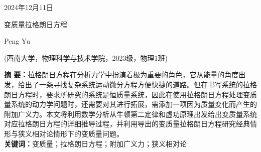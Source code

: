 \documentclass[12pt,twoside]{article}
\numberwithin{equation}{section}    %
\begin{document}
\begin{center}
\end{center}

\begin{center}
    2024年12月11日
\end{center}



\newpage
{}              %
\setcounter{page}{1}                %
\begin{center}
    \heiti{}
    变质量拉格朗日方程                %
\end{center}


\begin{center}
    Peng Yu                         %

    (西南大学，物理科学与技术学院，2023级，物理1班)
\end{center}

\begin{flushleft}                   %
    \justifying                     %
    \textbf{摘 \hspace{0.5em} 要：}拉格朗日方程在分析力学中扮演着极为重要的角色，它从能量的角度出发，给出了一条寻找复杂系统运动微分方程方便快捷的道路。但在书写系统的拉格朗日方程时，要求所研究的系统是恒质量系统，因此在使用拉格朗日方程处理变质量系统的动力学问题时，还需要对其进行拓展，需添加一项因为质量变化而产生的附加广义力。本文将利用数学分析从牛顿第二定律和虚功原理出发给出变质量系统对应拉格朗日方程的详细推导过程，并利用导出的变质量拉格朗日方程研究经典情形与狭义相对论情形下的变质量问题。\\
    \textbf{关键词：}变质量；拉格朗日方程；附加广义力；狭义相对论
\end{flushleft}
\end{document}
